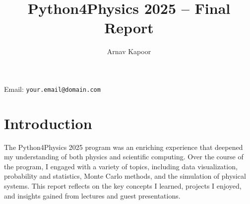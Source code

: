 \documentclass[12pt]{article}
\title{Python4Physics 2025 -- Final Report}
\author{Arnav Kapoor}
\date{}
\begin{document}
\maketitle
\noindent Email: \texttt{your.email@domain.com}

\section*{Introduction}
The Python4Physics 2025 program was an enriching experience that deepened my understanding of both physics and scientific computing. Over the course of the program, I engaged with a variety of topics, including data visualization, probability and statistics, Monte Carlo methods, and the simulation of physical systems. This report reflects on the key concepts I learned, projects I enjoyed, and insights gained from lectures and guest presentations.
\end{document}
